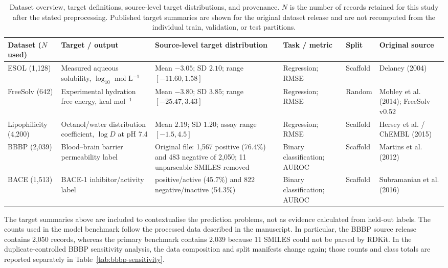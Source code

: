 \documentclass[10pt,a4paper]{article}
\renewcommand{\thetable}{S\arabic{table}}
\begin{document}
\begin{table}[H]
\renewcommand{\thetable}{S1}
\caption{Dataset overview, target definitions, source-level target distributions, and provenance. $N$ is the number of records retained for this study after the stated preprocessing. Published target summaries are shown for the original dataset release and are not recomputed from the individual train, validation, or test partitions.}\label{tab:dataset-summary}
\centering\footnotesize
\setlength{\tabcolsep}{2pt}
\begin{tabular}{@{}>{\raggedright\arraybackslash}p{}>{\raggedright\arraybackslash}p{}>{\raggedright\arraybackslash}p{}>{\raggedright\arraybackslash}p{}>{\raggedright\arraybackslash}p{}>{\raggedright\arraybackslash}p{}@{}}
\toprule
Dataset ($N$ used) & Target / output & Source-level target distribution & Task / metric & Split & Original source \\
\midrule
ESOL (1,128) & Measured aqueous solubility, $\log_{10}$ mol L$^{-1}$ & Mean $-3.05$; SD $2.10$; range $[-11.60,1.58]$ & Regression; RMSE & Scaffold & Delaney (2004) \\
FreeSolv (642) & Experimental hydration free energy, kcal mol$^{-1}$ & Mean $-3.80$; SD $3.85$; range $[-25.47,3.43]$ & Regression; RMSE & Random & Mobley et al. (2014); FreeSolv v0.52 \\
Lipophilicity (4,200) & Octanol/water distribution coefficient, $\log D$ at pH 7.4 & Mean $2.19$; SD $1.20$; assay range $[-1.5,4.5]$ & Regression; RMSE & Scaffold & Hersey et al. / ChEMBL (2015) \\
BBBP (2,039) & Blood--brain barrier permeability label & Original file: 1,567 positive (76.4\%) and 483 negative of 2,050; 11 unparseable SMILES removed & Binary classification; AUROC & Scaffold & Martins et al. (2012) \\
BACE (1,513) & BACE-1 inhibitor/activity label & 691 positive/active (45.7\%) and 822 negative/inactive (54.3\%) & Binary classification; AUROC & Scaffold & Subramanian et al. (2016) \\
\bottomrule
\end{tabular}
\end{table}

The target summaries above are included to contextualise the prediction problems, not as evidence calculated from held-out labels. The counts used in the model benchmark follow the processed data described in the manuscript. In particular, the BBBP source release contains 2,050 records, whereas the primary benchmark contains 2,039 because 11 SMILES could not be parsed by RDKit. In the duplicate-controlled BBBP sensitivity analysis, the data composition and split manifests change again; those counts and class totals are reported separately in Table~\ref{tab:bbbp-sensitivity}.
\end{document}
